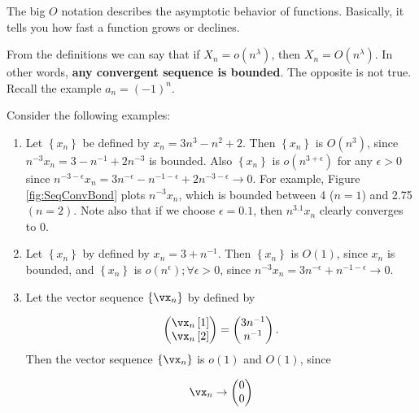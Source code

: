The big $O$ notation describes the asymptotic behavior of functions. Basically, it tells you how fast a function grows or declines. 

\begin{remark}
From the definitions we can say that if $X_n = o(n^\lambda)$, then $X_n = O(n^\lambda)$. In other words, \textbf{any convergent sequence is bounded}. The opposite is not true. Recall the example $a_n = (-1)^n$.
\end{remark}

\begin{example}
Consider the following examples:

\begin{enumerate}
  \item Let $\left\lbrace x_n\right\rbrace$ be defined by $x_n = 3n^3 - n^2 + 2$. Then $\left\lbrace x_n\right\rbrace$ is $O(n^3)$, since $n^{-3}x_n = 3 - n^{-1} + 2n^{-3}$ is bounded. Also $\left\lbrace x_n\right\rbrace$ is $o(n^{3 + \epsilon})$ for any $\epsilon > 0$ since $n^{ - 3 - \epsilon}x_n = 3n^{-\epsilon} - n^{-1 - \epsilon} + 2n^{-3 - \epsilon}\to 0$. For example, Figure \ref{fig:SeqConvBond} plots $n^{-3}x_n$, which is bounded between 4 ($n = 1$) and 2.75 $(n = 2)$. Note also that if we choose $\epsilon = 0.1$, then $n^{3.1}x_n$ clearly converges to 0.
  \item Let $\left\lbrace x_n\right\rbrace$ by defined by $x_n = 3 + n^{-1}$. Then $\left\lbrace x_n\right\rbrace$ is $O(1)$, since $x_n$ is bounded, and $\left\lbrace x_n\right\rbrace$ is $o(n^\epsilon);\forall \epsilon > 0$, since $n^{-3}x_n = 3n^{-\epsilon} + n^{-1 - \epsilon}\to 0$. 
  \item Let the vector sequence $\left\lbrace \vx_n\right\rbrace$ by defined by
  
  \begin{equation*}
    \begin{pmatrix}
    \vx_n\left[1\right] \\
    \vx_n\left[2\right]
    \end{pmatrix}= 
    \begin{pmatrix}
      3n^{-1} \\
      n^{-1}
    \end{pmatrix}.
  \end{equation*}
  Then the vector sequence $\left\lbrace \vx_n\right\rbrace$ is $o(1)$ and $O(1)$, since
  
  \begin{equation*}
    \vx_n \to \begin{pmatrix} 0 \\ 0 \end{pmatrix}
  \end{equation*}
\end{enumerate}
\end{example}

